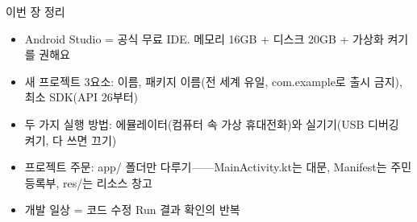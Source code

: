 \begin{tcbsummary}{이번 장 정리}
\begin{itemize}
  \item Android Studio = 공식 무료 IDE. 메모리 16GB + 디스크 20GB + 가상화 켜기를 권해요
  \item 새 프로젝트 3요소: 이름, 패키지 이름(전 세계 유일, com.example로 출시 금지), 최소 SDK(API 26부터)
  \item 두 가지 실행 방법: 에뮬레이터(컴퓨터 속 가상 휴대전화)와 실기기(USB 디버깅 켜기, 다 쓰면 끄기)
  \item 프로젝트 주문: app/ 폴더만 다루기——MainActivity.kt는 대문, Manifest는 주민등록부, res/는 리소스 창고
  \item 개발 일상 = 코드 수정 Run 결과 확인의 반복
\end{itemize}

\end{tcbsummary}
